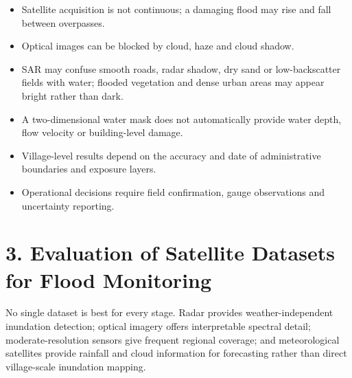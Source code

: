 \documentclass[11pt,a4paper]{article}
\begin{document}
\begin{itemize}
\item
  Satellite acquisition is not continuous; a damaging flood may rise and fall between overpasses.
\item
  Optical images can be blocked by cloud, haze and cloud shadow.
\item
  SAR may confuse smooth roads, radar shadow, dry sand or low-backscatter fields with water; flooded vegetation and dense urban areas may appear bright rather than dark.
\item
  A two-dimensional water mask does not automatically provide water depth, flow velocity or building-level damage.
\item
  Village-level results depend on the accuracy and date of administrative boundaries and exposure layers.
\item
  Operational decisions require field confirmation, gauge observations and uncertainty reporting.
\end{itemize}

\section{3. Evaluation of Satellite Datasets for Flood Monitoring}\label{evaluation-of-satellite-datasets-for-flood-monitoring}

No single dataset is best for every stage. Radar provides weather-independent inundation detection; optical imagery offers interpretable spectral detail; moderate-resolution sensors give frequent regional coverage; and meteorological satellites provide rainfall and cloud information for forecasting rather than direct village-scale inundation mapping.
\end{document}
